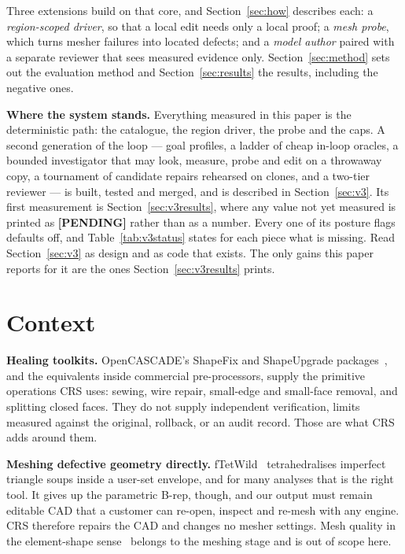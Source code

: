 \documentclass[10pt,onecolumn]{article}
\newcommand{\topic}[1]{\textbf{#1.}\hspace{0.5em}\ignorespaces}
\begin{document}
Three extensions build on that core, and Section~\ref{sec:how} describes each: a
\emph{region-scoped driver}, so that a local edit needs only a local proof; a \emph{mesh probe},
which turns mesher failures into located defects; and a \emph{model author} paired with a separate
reviewer that sees measured evidence only. Section~\ref{sec:method} sets out the evaluation method
and Section~\ref{sec:results} the results, including the negative ones.

\topic{Where the system stands} Everything measured in this paper is the deterministic path: the
catalogue, the region driver, the probe and the caps. A second generation of the loop --- goal
profiles, a ladder of cheap in-loop oracles, a bounded investigator that may look, measure, probe
and edit on a throwaway copy, a tournament of candidate repairs rehearsed on clones, and a two-tier
reviewer --- is built, tested and merged, and is described in Section~\ref{sec:v3}. Its first
measurement is Section~\ref{sec:v3results}, where any value not yet measured is printed as
\textbf{[PENDING]} rather than as a number. Every one of its posture flags defaults off, and
Table~\ref{tab:v3status} states for each piece what is missing. Read Section~\ref{sec:v3} as
design and as code that exists. The only gains this paper reports for it are the ones
Section~\ref{sec:v3results} prints.

\section{Context}

\topic{Healing toolkits} OpenCASCADE's ShapeFix and ShapeUpgrade packages~\cite{occt}, and the
equivalents inside commercial pre-processors, supply the primitive operations CRS uses: sewing,
wire repair, small-edge and small-face removal, and splitting closed faces. They do not supply
independent verification, limits measured against the original, rollback, or an audit record. Those
are what CRS adds around them.

\topic{Meshing defective geometry directly} fTetWild~\cite{ftetwild} tetrahedralises
imperfect triangle soups inside a user-set envelope, and for many analyses that is the right tool.
It gives up the parametric B-rep, though, and our output must remain editable CAD that a customer
can re-open, inspect and re-mesh with any engine. CRS therefore repairs the CAD and changes no
mesher settings. Mesh quality in the element-shape sense~\cite{shewchuk,knupp} belongs to the
meshing stage and is out of scope here.
\end{document}

